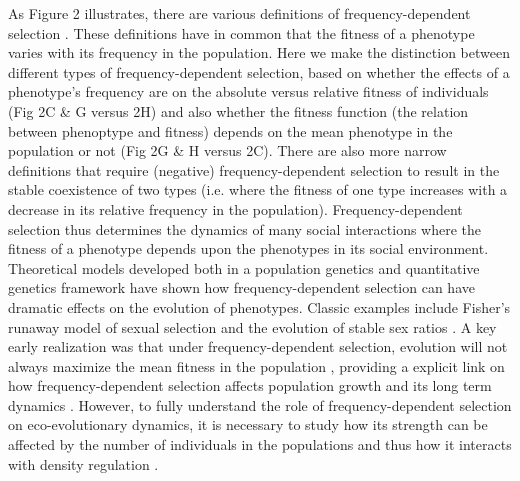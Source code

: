 \documentclass{article}
\begin{document}
 As Figure 2 illustrates, there are various definitions of frequency-dependent selection \citep{Heino1998}. These definitions have in common that the fitness of a phenotype varies with its frequency in the population. Here we make the distinction between different types of frequency-dependent selection, based on whether the effects of a phenotype's frequency are on the absolute versus relative fitness  of individuals (Fig 2C \& G versus 2H) and also whether the fitness function (the relation between phenoptype and fitness) depends on the mean phenotype in the population or not (Fig 2G \& H versus 2C). There are also more narrow definitions that require (negative) frequency-dependent selection to result in the stable coexistence of two types (i.e. where the fitness of one type increases with a decrease in its relative frequency in the population). Frequency-dependent selection thus determines the dynamics of many social interactions where the fitness of a phenotype depends upon the phenotypes in its social environment. Theoretical models developed both in a population genetics \citep{Wright1969} and quantitative genetics \citep{Lande2007, Engen2020} framework have shown how frequency-dependent selection can have dramatic effects on the evolution of phenotypes. Classic examples include Fisher's runaway model of sexual selection and the evolution of stable sex ratios \citep{Fisher1930}. A key early realization was that under frequency-dependent selection, evolution will not always maximize the mean fitness in the population \citep{Wright1969}, providing a explicit link on how frequency-dependent selection affects population growth and its long term dynamics \citep{Svensson2018}. However, to fully understand the role of frequency-dependent selection on eco-evolutionary dynamics, it is necessary to study how its strength can be affected by the number of individuals in the populations and thus how it interacts with density regulation \citep{Anderson1971, Matessi1976, Asmussen1983, Heino1998, Joshi2001, Engen2020}. 
 
\end{document}
